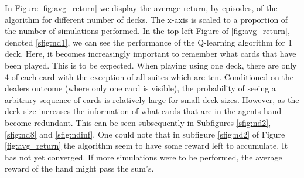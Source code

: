 In Figure \ref{fig:avg_return} we display the average return, by episodes, of the algorithm for different number of decks. The x-axis is scaled to a proportion of the number of simulations performed. In the top left Figure of \ref{fig:avg_return}, denoted \ref{sfig:nd1}, we can see the performance of the Q-learning algorithm for 1 deck. Here, it becomes increasingly important to remember what cards that have been played. This is to be expected. When playing using one deck, there are only 4 of each card with the exception of all suites which are ten. Conditioned on the dealers outcome (where only one card is visible), the probability of seeing a arbitrary sequence of cards is relatively large for small deck sizes. However, as the deck size increases the information of what cards that are in the agents hand become redundant. This can be seen subsequently in Subfigures \ref{sfig:nd2}, \ref{sfig:nd8} and \ref{sfig:ndinf}. One could note that in subfigure \ref{sfig:nd2} of Figure \ref{fig:avg_return} the algorithm seem to have some reward left to accumulate. It has not yet converged. If more simulations were to be performed, the average reward of the hand might pass the sum's. 
